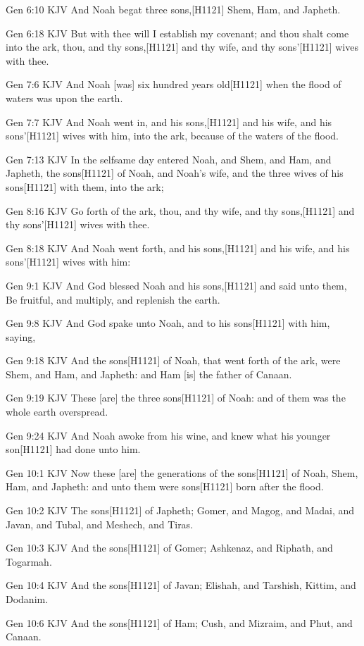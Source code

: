 \documentclass{book}
\begin{document}
Gen 6:10 KJV
And Noah begat three sons,[H1121] Shem, Ham, and Japheth.

Gen 6:18 KJV
But with thee will I establish my covenant; and thou shalt come into the ark, thou, and thy sons,[H1121] and thy wife, and thy sons'[H1121] wives with thee.

Gen 7:6 KJV
And Noah [was] six hundred years old[H1121] when the flood of waters was upon the earth.

Gen 7:7 KJV
And Noah went in, and his sons,[H1121] and his wife, and his sons'[H1121] wives with him, into the ark, because of the waters of the flood.

Gen 7:13 KJV
In the selfsame day entered Noah, and Shem, and Ham, and Japheth, the sons[H1121] of Noah, and Noah's wife, and the three wives of his sons[H1121] with them, into the ark;

Gen 8:16 KJV
Go forth of the ark, thou, and thy wife, and thy sons,[H1121] and thy sons'[H1121] wives with thee.

Gen 8:18 KJV
And Noah went forth, and his sons,[H1121] and his wife, and his sons'[H1121] wives with him:

Gen 9:1 KJV
And God blessed Noah and his sons,[H1121] and said unto them, Be fruitful, and multiply, and replenish the earth.

Gen 9:8 KJV
And God spake unto Noah, and to his sons[H1121] with him, saying,

Gen 9:18 KJV
And the sons[H1121] of Noah, that went forth of the ark, were Shem, and Ham, and Japheth: and Ham [is] the father of Canaan.

Gen 9:19 KJV
These [are] the three sons[H1121] of Noah: and of them was the whole earth overspread.

Gen 9:24 KJV
And Noah awoke from his wine, and knew what his younger son[H1121] had done unto him.

Gen 10:1 KJV
Now these [are] the generations of the sons[H1121] of Noah, Shem, Ham, and Japheth: and unto them were sons[H1121] born after the flood.

Gen 10:2 KJV
The sons[H1121] of Japheth; Gomer, and Magog, and Madai, and Javan, and Tubal, and Meshech, and Tiras.

Gen 10:3 KJV
And the sons[H1121] of Gomer; Ashkenaz, and Riphath, and Togarmah.

Gen 10:4 KJV
And the sons[H1121] of Javan; Elishah, and Tarshish, Kittim, and Dodanim.

Gen 10:6 KJV
And the sons[H1121] of Ham; Cush, and Mizraim, and Phut, and Canaan.
\end{document}
